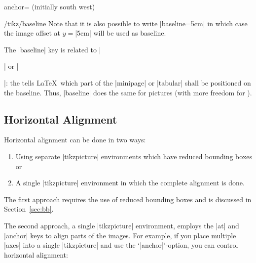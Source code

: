 \begin{pgfplotskey}{anchor= (initially south west)}
\begin{key}{/tikz/baseline}
	Note that it is also possible to write |baseline=5cm| in which case the image offset at $y=$|5cm| will be used as baseline.
\end{key}
The |baseline| key is related to |\begin{minipage}| or |\begin{tabular}|: the  tells \LaTeX\ which part of the |minipage| or |tabular| shall be positioned on the baseline. Thus, |baseline| does the same for pictures (with more freedom for ).

\subsection{Horizontal Alignment}
\label{sec:halign}%
Horizontal alignment can be done in two ways:
\begin{enumerate}
	\item Using separate |tikzpicture| environments which have reduced bounding boxes or
	\item A single |tikzpicture| environment in which the complete alignment is done.
\end{enumerate}
The first approach requires the use of reduced bounding boxes and is discussed in Section~\ref{sec:bb}.

The second approach, a single |tikzpicture| environment, employs the |at| and |anchor| keys to align parts of the images. For example, if you place multiple |axes| into a single |tikzpicture| and use the `|anchor|'-option, you can control horizontal alignment:
%
\begin{codeexample}[]
\end{codeexample}
\end{tabular}
\end{minipage}
\end{pgfplotskey}
